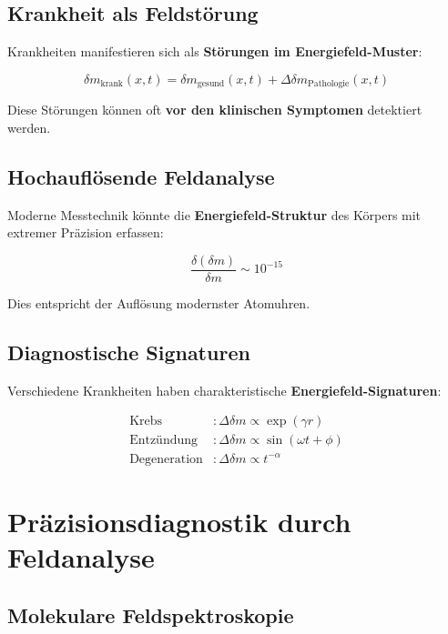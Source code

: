 \documentclass[12pt,a4paper]{report}
\begin{document}
	\subsection{Krankheit als Feldstörung}
	
	Krankheiten manifestieren sich als \textbf{Störungen im Energiefeld-Muster}:
	
	\begin{equation}
		\delta m_{\text{krank}}(x,t) = \delta m_{\text{gesund}}(x,t) + \Delta\delta m_{\text{Pathologie}}(x,t)
	\end{equation}
	
	Diese Störungen können oft \textbf{vor den klinischen Symptomen} detektiert werden.
	
	\subsection{Hochauflösende Feldanalyse}
	
	Moderne Messtechnik könnte die \textbf{Energiefeld-Struktur} des Körpers mit extremer Präzision erfassen:
	
	\begin{equation}
		\frac{\delta(\delta m)}{\delta m} \sim 10^{-15}
	\end{equation}
	
	Dies entspricht der Auflösung modernster Atomuhren.
	
	\subsection{Diagnostische Signaturen}
	
	Verschiedene Krankheiten haben charakteristische \textbf{Energiefeld-Signaturen}:
	
	\begin{align}
		\text{Krebs} &: \Delta\delta m \propto \exp(\gamma r) \\
		\text{Entzündung} &: \Delta\delta m \propto \sin(\omega t + \phi) \\
		\text{Degeneration} &: \Delta\delta m \propto t^{-\alpha}
	\end{align}
	
	\section{Präzisionsdiagnostik durch Feldanalyse}
	
	\subsection{Molekulare Feldspektroskopie}
	
\end{document}
